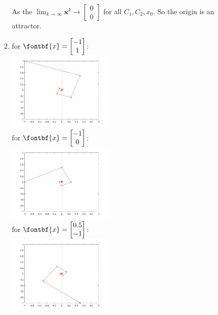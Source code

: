 \documentclass{article}
\newcommand{\newVec}[2]{\begin{bmatrix}#1 \\ #2 \end{bmatrix}}
\newcommand{\newttt}[9]{\begin{bmatrix}#1 & #2 & #3\\ #4 & #5 & #6 \\ #7 & #8 & #9\end{bmatrix}}
\begin{document}
\begin{enumerate}
\begin{enumerate}
             As the $\lim_{k\to\infty} \textbf{x}^k \rightarrow \newVec{0}{0}$ for all $C_1, C_2, x_0$. So the origin is an attractor.
    \item{
    for $\fontbf{x} = \newVec{-1}{1}$:\\ \includegraphics[width=50mm,scale=1]{Matlab1_3}\\\newpage
    for $\fontbf{x} = \newVec{-1}{0}$:\\
    \includegraphics[width=50mm,scale=1]{Matlab1_4}\\
    for $\fontbf{x} = \newVec{0.5}{-1}$:\\
    \includegraphics[width=50mm,scale=1]{Matlab1_5}\\
    }
\end{enumerate}

\newcommand{\matP}{\newttt{\frac{1}{2}}{\frac{1}{3}}{\frac{1}{3}}{0}{\frac{1}{3}}{\frac{2}{3}}{\frac{1}{2}}{\frac{1}{3}}{0}}
\newcommand{\matPmult}{\newttt{3}{2}{3}{0}{2}{4}{3}{2}{0}}
\newcommand{\newtttdet}[9]{\begin{vmatrix}#1 & #2 & #3\\ #4 & #5 & #6 \\ #7 & #8 & #9\end{vmatrix}}


\end{enumerate}
\end{document}

